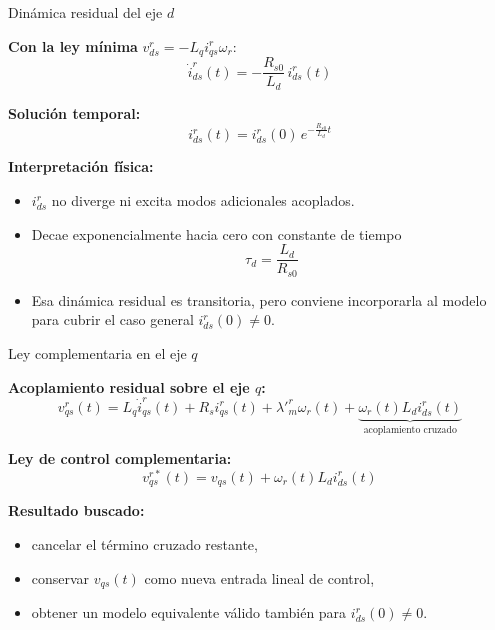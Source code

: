 \documentclass[aspectratio=169,t]{beamer}
\begin{document}
\begin{frame}{Dinámica residual del eje $d$}
\vspace{3mm}

\textbf{Con la ley mínima} $v_{ds}^{r}=-L_q i_{qs}^{r}\omega_r$:
\begin{equation*}
\dot{i}_{ds}^{r}(t)= -\frac{R_{s0}}{L_d}\,i_{ds}^{r}(t)
\end{equation*}

\textbf{Solución temporal:}
\begin{equation*}
i_{ds}^{r}(t)=i_{ds}^{r}(0)\,e^{-\frac{R_{s0}}{L_d}t}
\end{equation*}

\textbf{Interpretación física:}
\begin{itemize}
  \item $i_{ds}^{r}$ no diverge ni excita modos adicionales acoplados.
  \item Decae exponencialmente hacia cero con constante de tiempo
  \[
  \tau_d=\frac{L_d}{R_{s0}}
  \]
  \item Esa dinámica residual es transitoria, pero conviene incorporarla al modelo para cubrir el caso general $i_{ds}^r(0)\neq 0$.
\end{itemize}
\end{frame}

\begin{frame}{Ley complementaria en el eje $q$}
\vspace{3mm}

\textbf{Acoplamiento residual sobre el eje $q$:}
\begin{equation*}
v_{qs}^{r}(t)=L_q\dot{i}_{qs}^{r}(t)+R_s i_{qs}^{r}(t)+\lambda'^r_m\omega_r(t)+
\underbrace{\omega_r(t)L_d i_{ds}^{r}(t)}_{\text{acoplamiento cruzado}}
\end{equation*}

\textbf{Ley de control complementaria:}
\begin{equation*}
\boxed{\;v_{qs}^{r*}(t)=v_{qs}(t)+\omega_r(t)L_d i_{ds}^{r}(t)\;}
\end{equation*}

\textbf{Resultado buscado:}
\begin{itemize}
  \item cancelar el término cruzado restante,
  \item conservar $v_{qs}(t)$ como nueva entrada lineal de control,
  \item obtener un modelo equivalente válido también para $i_{ds}^{r}(0)\neq 0$.
\end{itemize}
\end{frame}
\end{document}

